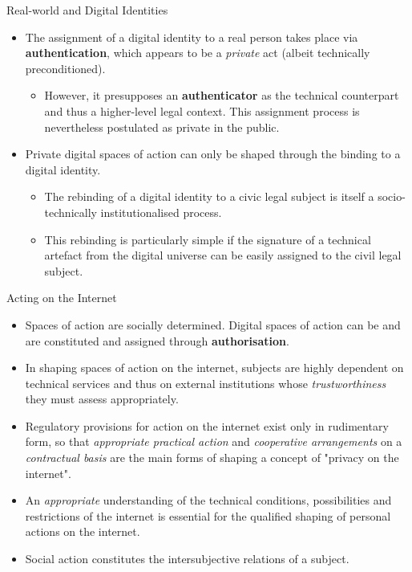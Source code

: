 \documentclass{beamer}
\begin{document}
\begin{frame}{Real-world and Digital Identities}
\begin{itemize}
\item The assignment of a digital identity to a real person takes place via
  \textbf{authentication}, which appears to be a \emph{private} act (albeit
  technically preconditioned).
  \begin{itemize}
  \item However, it presupposes an \textbf{authenticator} as the technical
    counterpart and thus a higher-level legal context. This assignment process
    is nevertheless postulated as private in the public.
  \end{itemize}
\item Private digital spaces of action can only be shaped through the
  binding to a digital identity.
  \begin{itemize}
  \item The rebinding of a digital identity to a civic legal subject is itself
    a socio-technically institutionalised process.
  \item This rebinding is particularly simple if the signature of a technical
    artefact from the digital universe can be easily assigned to the civil
    legal subject.
  \end{itemize}
\end{itemize}
\end{frame}
\begin{frame}{Acting on the Internet}\small
\begin{itemize}
\item Spaces of action are socially determined. Digital spaces of action can
  be and are constituted and assigned through \textbf{authorisation}.
\item In shaping spaces of action on the internet, subjects are highly
  dependent on technical services and thus on external institutions whose
  \emph{trustworthiness} they must assess appropriately.
\item Regulatory provisions for action on the internet exist only in
  rudimentary form, so that \emph{appropriate practical action} and
  \emph{cooperative arrangements} on a \emph{contractual basis} are the main
  forms of shaping a concept of "privacy on the internet".
\item An \emph{appropriate} understanding of the technical conditions,
  possibilities and restrictions of the internet is essential for the
  qualified shaping of personal actions on the internet.
\item Social action constitutes the intersubjective relations of a subject.
\end{itemize}
\end{frame}
\end{document}
